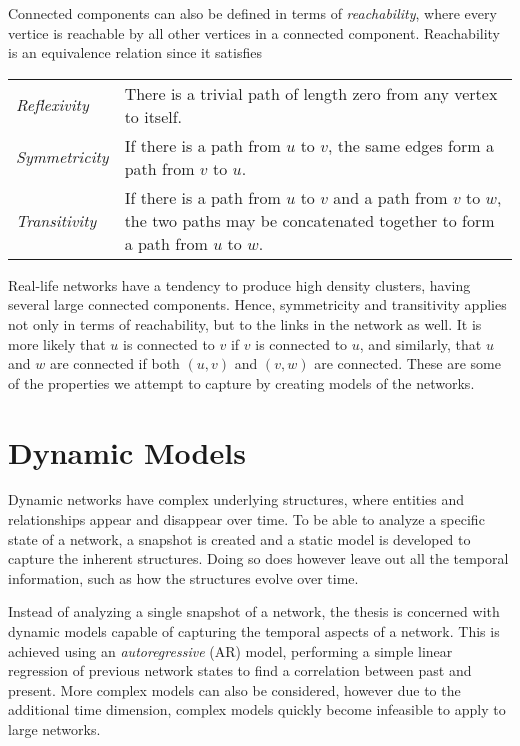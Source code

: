     Connected components can also be defined in terms of \emph{reachability}, where every vertice is reachable by all other vertices in a connected component. Reachability is an equivalence relation since it satisfies
    \par\begin{tabular}{>{\itshape}l p{}}
        Reflexivity  & There is a trivial path of length zero from any vertex to itself. \\
        Symmetricity & If there is a path from $u$ to $v$, the same edges form a path from $v$ to $u$. \\
        Transitivity & If there is a path from $u$ to $v$ and a path from $v$ to $w$, the two paths may be concatenated together to form a path from $u$ to $w$.
    \end{tabular}
    
    Real-life networks have a tendency to produce high density clusters, having several large connected components. Hence, symmetricity and transitivity applies not only in terms of reachability, but to the links in the network as well. It is more likely that $u$ is connected to $v$ if $v$ is connected to $u$, and similarly, that $u$ and $w$ are connected if both $(u,v)$ and $(v,w)$ are connected. These are some of the properties we attempt to capture by creating models of the networks.

\section{Dynamic Models}

    Dynamic networks have complex underlying structures, where entities and relationships appear and disappear over time. To be able to analyze a specific state of a network, a snapshot is created and a static model is developed to capture the inherent structures.
    Doing so does however leave out all the temporal information, such as how the structures evolve over time.
    
    Instead of analyzing a single snapshot of a network, the thesis is concerned with dynamic models capable of capturing the temporal aspects of a network. This is achieved using an \emph{autoregressive} (AR) model, performing a simple linear regression of previous network states to find a correlation between past and present. More complex models can also be considered, however due to the additional time dimension, complex models quickly become infeasible to apply to large networks.
    

